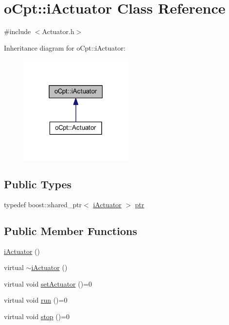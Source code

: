 \hypertarget{classo_cpt_1_1i_actuator}{}\section{o\+Cpt\+:\+:i\+Actuator Class Reference}
\label{classo_cpt_1_1i_actuator}


{\ttfamily \#include $<$Actuator.\+h$>$}



Inheritance diagram for o\+Cpt\+:\+:i\+Actuator\+:
\nopagebreak
\begin{figure}[H]
\begin{center}
\leavevmode
\includegraphics[width=162pt]{classo_cpt_1_1i_actuator__inherit__graph}
\end{center}
\end{figure}
\subsection*{Public Types}
\begin{DoxyCompactItemize}
\item 
typedef boost\+::shared\+\_\+ptr$<$ \hyperlink{classo_cpt_1_1i_actuator}{i\+Actuator} $>$ \hyperlink{classo_cpt_1_1i_actuator_a35847799558e92bb84fb6c71de772cac}{ptr}
\end{DoxyCompactItemize}
\subsection*{Public Member Functions}
\begin{DoxyCompactItemize}
\item 
\hyperlink{classo_cpt_1_1i_actuator_aa54aeed96c53b59fd4caa93bc29ce615}{i\+Actuator} ()
\item 
virtual \hyperlink{classo_cpt_1_1i_actuator_a9ec8a13b323499731fcb43c728c4812e}{$\sim$i\+Actuator} ()
\item 
virtual void \hyperlink{classo_cpt_1_1i_actuator_a1654bf3167a1dd7c34f770180cd8aaa1}{set\+Actuator} ()=0
\item 
virtual void \hyperlink{classo_cpt_1_1i_actuator_abf4db1f9f6b59bdefc86ca44aed0f49a}{run} ()=0
\item 
virtual void \hyperlink{classo_cpt_1_1i_actuator_ae3f9fbb61d920bee1bd297fb5a89625e}{stop} ()=0
\end{DoxyCompactItemize}


